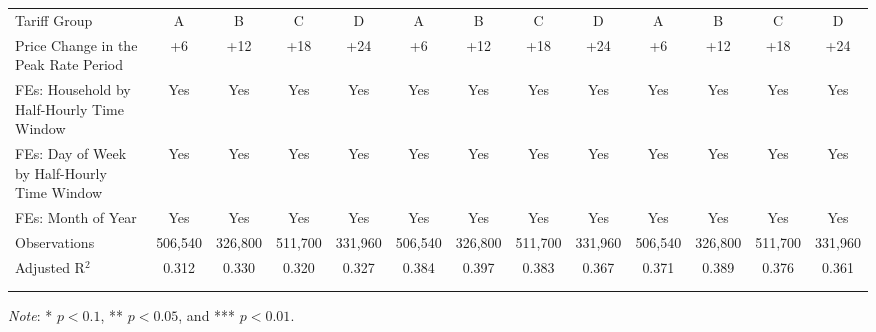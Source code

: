 {\begin{landscape}
\begin{table}[t!]
\begin{adjustbox}{scale = 0.7}
\begin{threeparttable}
\begin{tabular}{@{\extracolsep{1pt}}lcccccccccccc}
                    Tariff Group & A & B & C & D & A & B & C & D & A & B & C & D \\
                    Price Change in the Peak Rate Period & +6 & +12 & +18 & +24 & +6 & +12 & +18 & +24 & +6 & +12 & +18 & +24 \\
                    FEs: Household by Half-Hourly Time Window & Yes & Yes & Yes & Yes & Yes & Yes & Yes & Yes & Yes & Yes & Yes & Yes \\
                    FEs: Day of Week by Half-Hourly Time Window & Yes & Yes & Yes & Yes & Yes & Yes & Yes & Yes & Yes & Yes & Yes & Yes \\
                    FEs: Month of Year & Yes & Yes & Yes & Yes & Yes & Yes & Yes & Yes & Yes & Yes & Yes & Yes \\
                    Observations & 506,540 & 326,800 & 511,700 & 331,960 & 506,540 & 326,800 & 511,700 & 331,960 & 506,540 & 326,800 & 511,700 & 331,960 \\
                    Adjusted R$^{2}$ & 0.312 & 0.330 & 0.320 & 0.327 & 0.384 & 0.397 & 0.383 & 0.367 & 0.371 & 0.389 & 0.376 & 0.361 \\
                    \\[-2.0ex]
                    \hline \hline
                    \\[-4.5ex]
                \end{tabular}
                \begin{tablenotes}[flushleft]
                    \footnotesize
                    \item \textit{Note}: * $p < 0.1$, ** $p < 0.05$, and *** $p < 0.01$.
                \end{tablenotes}
            \end{threeparttable}
        \end{adjustbox}
    \end{table} 
    \end{landscape}
}
